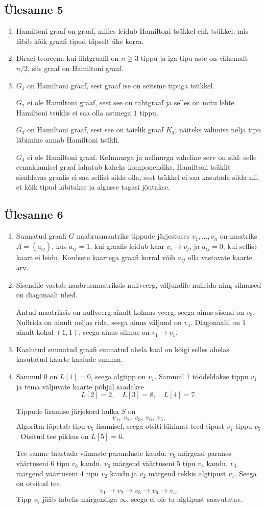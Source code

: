 \documentclass[11pt,a4paper]{article}
\newcommand{\yl}[1]{\subsection*{Ülesanne #1}}
\begin{document}
\yl{5}
\begin{enumerate}[label=\alph*.]
\item Hamiltoni graaf on graaf, milles leidub Hamiltoni tsükkel ehk tsükkel, mis läbib kõik graafi tipud täpselt ühe korra.
\item Diraci teoreem: kui lihtgraafil on $n\ge 3$ tippu ja iga tipu aste on vähemalt $n/2$, siis graaf on Hamiltoni graaf.
\item $G_1$ on Hamiltoni graaf, sest graaf ise on seitsme tipuga tsükkel.

$G_2$ ei ole Hamiltoni graaf, sest see on tähtgraaf ja selles on mitu lehte. Hamiltoni tsüklis ei saa olla astmega $1$ tippu.

$G_3$ on Hamiltoni graaf, sest see on täielik graaf $K_4$; näiteks välimise nelja tipu läbimine annab Hamiltoni tsükli.

$G_4$ ei ole Hamiltoni graaf. Kolmnurga ja nelinurga vaheline serv on sild: selle eemaldamisel graaf lahutub kaheks komponendiks. Hamiltoni tsüklit sisaldavas graafis ei saa sellist silda olla, sest tsükkel ei saa kasutada silda nii, et kõik tipud läbitakse ja algusse tagasi jõutakse.
\end{enumerate}

\yl{6}
\begin{enumerate}[label=\alph*.]
\item Suunatud graafi $G$ naabrusmaatriks tippude järjestuses $v_1,\ldots,v_n$ on maatriks $A=(a_{ij})$, kus $a_{ij}=1$, kui graafis leidub kaar $v_i\to v_j$, ja $a_{ij}=0$, kui sellist kaart ei leidu. Kordsete kaartega graafi korral võib $a_{ij}$ olla vastavate kaarte arv.
\item Sisendile vastab naabrusmaatriksis nullveerg, väljundile nullrida ning silmused on diagonaali ühed.

Antud maatriksis on nullveerg ainult kolmas veerg, seega ainus sisend on $v_3$. Nullrida on ainult neljas rida, seega ainus väljund on $v_4$. Diagonaalil on $1$ ainult kohal $(1,1)$, seega ainus silmus on $v_1\to v_1$.
\item Kaalutud suunatud graafi suunatud ahela kaal on kõigi selles ahelas kasutatud kaarte kaalude summa.
\item Sammul 0 on $L[1]=0$, seega algtipp on $v_1$. Sammul 1 töödeldakse tippu $v_1$ ja tema väljuvate kaarte põhjal saadakse
\[
L[2]=2,
\quad L[3]=8,
\quad L[4]=7.
\]

Tippude lisamise järjekord hulka $S$ on
\[
v_1,
\ v_2,
\ v_3,
\ v_6,
\ v_5.
\]
Algoritm lõpetab tipu $v_5$ lisamisel, seega otsiti lühimat teed tipust $v_1$ tippu $v_5$. Otsitud tee pikkus on $L[5]=6$.

Tee saame taastada viimaste paranduste kaudu: $v_5$ märgend paranes väärtuseni $6$ tipu $v_6$ kaudu, $v_6$ märgend väärtuseni $5$ tipu $v_3$ kaudu, $v_3$ märgend väärtuseni $4$ tipu $v_2$ kaudu ja $v_2$ märgend tekkis algtipust $v_1$. Seega on otsitud tee
\[
v_1\to v_2\to v_3\to v_6\to v_5.
\]
Tipp $v_7$ jääb tabelis märgendiga $\infty$, seega ei ole ta algtipust saavutatav.
\end{enumerate}
\end{document}
